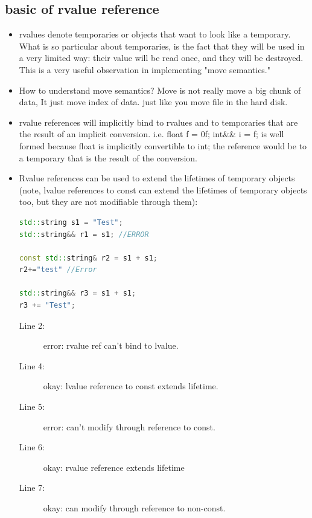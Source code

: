 \documentclass[a4paper,11pt,twoside]{book}
\begin{document}
\subsection{basic of rvalue reference}
\begin{itemize}

	\item rvalues denote temporaries or objects that want to look like a temporary. What is so particular about temporaries, is the fact that they will be used in a very limited way: their value will be read once, and they will be destroyed. This is a very useful observation in implementing "move semantics." 

	\item How to understand move semantics? Move is not really move a big chunk of data, It just move index of data. just like you move file in the hard disk. 

	\item rvalue references will implicitly bind to rvalues and to temporaries that are the result of an implicit conversion. i.e. float f = 0f; int\&\& i = f; is well formed because float is implicitly convertible to int; the reference would be to a temporary that is the result of the conversion.

	\item Rvalue references can be used to extend the lifetimes of temporary objects (note, lvalue references to const can extend the lifetimes of temporary objects too, but they are not modifiable through them):

\begin{lstlisting}[frame=single, language=c++, mathescape=true]
std::string s1 = "Test";
std::string&& r1 = s1; //ERROR

const std::string& r2 = s1 + s1; 
r2+="test" //Error

std::string&& r3 = s1 + s1;      
r3 += "Test";                    
\end{lstlisting}
\begin{description}
	\item[Line 2:]  error: rvalue ref can't bind to lvalue.
	
	\item[Line 4:] okay: lvalue reference to const extends lifetime.

	\item[Line 5:] error: can't modify through reference to const.
	\item[Line 6:] okay: rvalue reference extends lifetime
	\item[Line 7:] okay: can modify through reference to non-const.
\end{description}

\end{itemize}
\end{document}
